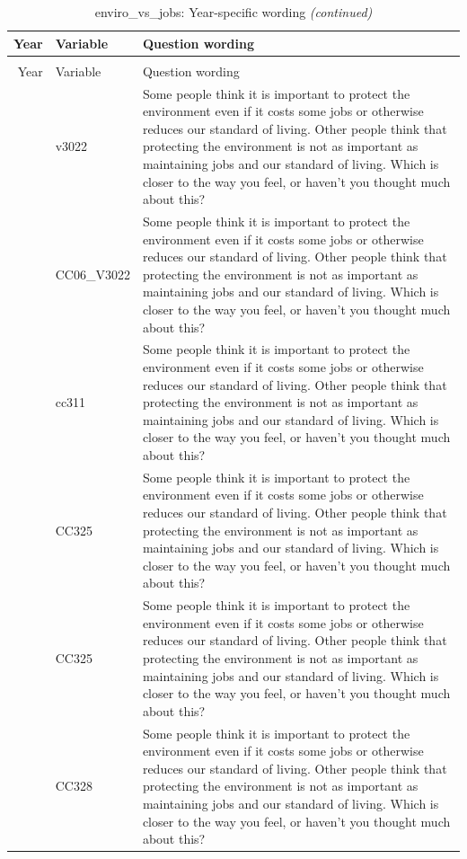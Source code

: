 \documentclass[
  12pt]{article}
\begin{document}
\begin{longtable}[t]{rl>{\raggedright\arraybackslash}p{10cm}}
\caption{\label{tab:unnamed-chunk-5}enviro\_vs\_jobs: Year-specific wording}\\
\toprule
Year & Variable & Question wording\\
\midrule
\endfirsthead
\caption[]{enviro\_vs\_jobs: Year-specific wording \textit{(continued)}}\\
\toprule
Year & Variable & Question wording\\
\midrule
\endhead

\endfoot
\bottomrule
\endlastfoot
2006 & v3022 & Some people think it is important to protect the environment even if it costs some jobs or otherwise reduces our standard of living. Other people think that protecting the environment is not as important as maintaining jobs and our standard of living.  Which is closer to the way you feel, or haven't you thought much about this?\\
\addlinespace
2007 & CC06\_V3022 & Some people think it is important to protect the environment even if it costs some jobs or otherwise reduces our standard of living. Other people think that protecting the environment is not as important as maintaining jobs and our standard of living. Which is closer to the way you feel, or haven't you thought much about this?\\
\addlinespace
2008 & cc311 & Some people think it is important to protect the environment even if it costs some jobs or otherwise reduces our standard of living. Other people think that protecting the environment is not as important as maintaining jobs and our standard of living. Which is closer to the way you feel, or haven't you thought much about this?\\
\addlinespace
2010 & CC325 & Some people think it is important to protect the environment even if it costs some jobs or otherwise reduces our standard of living. Other people think that protecting the environment is not as important as maintaining jobs and our standard of living. Which is closer to the way you feel, or haven't you thought much about this?\\
\addlinespace
2012 & CC325 & Some people think it is important to protect the environment even if it costs some jobs or otherwise reduces our standard of living. Other people think that protecting the environment is not as important as maintaining jobs and our standard of living. Which is closer to the way you feel, or haven’t you thought much about this?\\
\addlinespace
2013 & CC328 & Some people think it is important to protect the environment even if it costs some jobs or otherwise reduces our standard of living. Other people think that protecting the environment is not as important as maintaining jobs and our standard of living. Which is closer to the way you feel, or haven't you thought much about this?\\*
\end{longtable}
\endgroup{}
\end{document}
